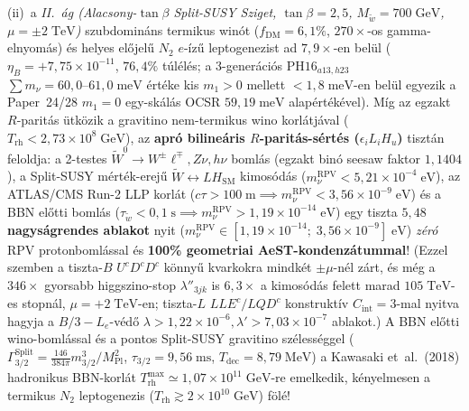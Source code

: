 \documentclass[11pt,a4paper]{article}
\begin{document}
\begin{enumerate}
\begin{itemize}
        (ii)~a \emph{II.~ág (Alacsony-$\tan\beta$ Split-SUSY Sziget, $\tan\beta=2{,}5$, $M_{\tilde w}=700\;\mathrm{GeV}$, $\mu=\pm 2\;\mathrm{TeV}$)} szubdomináns termikus winót ($f_{\mathrm{DM}}=6{,}1\%$, $270\times$-os gamma-elnyomás) és helyes előjelű $N_2$ $e$-ízű leptogenezist ad $7{,}9\times$-en belül ($\eta_B=+7{,}75\times 10^{-11}$, $76{,}4\%$ túlélés; a 3-generációs $\mathrm{PH16}_{a13,h23}$ $\sum m_\nu = 60{,}0\text{--}61{,}0\;\mathrm{meV}$ értéke kis $m_1>0$ mellett $<1{,}8\;\mathrm{meV}$-en belül egyezik a Paper~24/28 $m_1=0$ egy-skálás OCSR $59{,}19\;\mathrm{meV}$ alapértékével). Míg az egzakt $R$-paritás ütközik a gravitino nem-termikus wino korlátjával ($T_{\mathrm{rh}}<2{,}73\times 10^8\;\mathrm{GeV}$), az \textbf{apró bilineáris $R$-paritás-sértés ($\epsilon_i L_i H_u$)} tisztán feloldja: a 2-testes $\tilde W^0\to W^\pm\ell^\mp, Z\nu, h\nu$ bomlás (egzakt binó seesaw faktor $1{,}1404$), a Split-SUSY mérték-erejű $\tilde W\leftrightarrow L H_{\mathrm{SM}}$ kimosódás ($m_\nu^{\mathrm{RPV}}<5{,}21\times 10^{-4}\;\mathrm{eV}$), az ATLAS/CMS Run-2 LLP korlát ($c\tau>100\;\mathrm{m}\implies m_\nu^{\mathrm{RPV}}<3{,}56\times 10^{-9}\;\mathrm{eV}$) és a BBN előtti bomlás ($\tau_{\tilde w}<0{,}1\;\mathrm{s}\implies m_\nu^{\mathrm{RPV}}>1{,}19\times 10^{-14}\;\mathrm{eV}$) egy tiszta \textbf{$5{,}48$ nagyságrendes ablakot} nyit ($m_\nu^{\mathrm{RPV}}\in[1{,}19\times 10^{-14};\; 3{,}56\times 10^{-9}]\;\mathrm{eV}$) \emph{zéró} RPV protonbomlással és \textbf{100\% geometriai AeST-kondenzátummal}! (Ezzel szemben a tiszta-$B$ $U^c D^c D^c$ könnyű kvarkokra mindkét $\pm\mu$-nél zárt, és még a $346\times$ gyorsabb higgszino-stop $\lambda''_{3jk}$ is $6{,}3\times$ a kimosódás felett marad $105\;\mathrm{TeV}$-es stopnál, $\mu=+2\;\mathrm{TeV}$-en; tiszta-$L$ $LLE^c/LQD^c$ konstruktív $C_{\mathrm{int}}=3$-mal nyitva hagyja a $B/3-L_e$-védő $\lambda>1{,}22\times 10^{-6}, \lambda'>7{,}03\times 10^{-7}$ ablakot.) A BBN előtti wino-bomlással és a pontos Split-SUSY gravitino szélességgel ($\Gamma_{3/2}^{\mathrm{Split}}=\frac{146}{384\pi}m_{3/2}^3/M_{\mathrm{Pl}}^2$, $\tau_{3/2}=9{,}56\;\mathrm{ms}$, $T_{\mathrm{dec}}=8{,}79\;\mathrm{MeV}$) a Kawasaki et~al.\ (2018) hadronikus BBN-korlát \textbf{$T_{\mathrm{rh}}^{\max}\simeq 1{,}07\times 10^{11}\;\mathrm{GeV}$}-re emelkedik, kényelmesen a termikus $N_2$ leptogenezis ($T_{\mathrm{rh}}\gtrsim 2\times 10^{10}\;\mathrm{GeV}$) fölé!

\end{itemize}
\end{enumerate}
\end{document}
